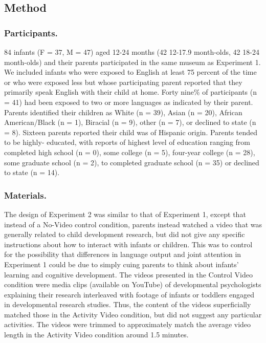 \documentclass[10pt, letterpaper]{article}
\begin{document}
\subsection{Method}\label{method-1}

\subsubsection{Participants.}\label{participants.-1}

84 infants (F = 37, M = 47) aged 12-24 months (42 12-17.9 month-olds, 42
18-24 month-olds) and their parents participated in the same museum as
Experiment 1. We included infants who were exposed to English at least
75 percent of the time or who were exposed less but whose participating
parent reported that they primarily speak English with their child at
home. Forty nine\% of participants (n = 41) had been exposed to two or
more languages as indicated by their parent. Parents identified their
children as White (n = 39), Asian (n = 20), African American/Black (n =
1), Biracial (n = 9), other (n = 7), or declined to state (n = 8).
Sixteen parents reported their child was of Hispanic origin. Parents
tended to be highly- educated, with reports of highest level of
education ranging from completed high school (n = 0), some college (n =
5), four-year college (n = 28), some graduate school (n = 2), to
completed graduate school (n = 35) or declined to state (n = 14).

\subsubsection{Materials.}\label{materials.-1}

The design of Experiment 2 was similar to that of Experiment 1, except
that instead of a No-Video control condition, parents instead watched a
video that was generally related to child development research, but did
not give any specific instructions about how to interact with infants or
children. This was to control for the possibility that differences in
language output and joint attention in Experiment 1 could be due to
simply cuing parents to think about infants' learning and cognitive
development. The videos presented in the Control Video condition were
media clips (available on YouTube) of developmental psychologists
explaining their research interleaved with footage of infants or
toddlers engaged in developmental research studies. Thus, the content of
the videos superficially matched those in the Activity Video condition,
but did not suggest any particular activities. The videos were trimmed
to approximately match the average video length in the Activity Video
condition around 1.5 minutes.
\end{document}
